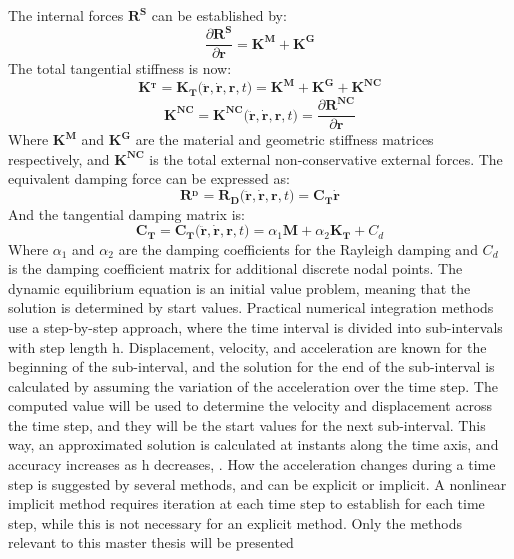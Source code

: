 \noindent The internal forces $\boldsymbol{R^S}$ can be established by:
\begin{equation}
    \frac{\partial \boldsymbol{R^S} }{\partial\boldsymbol{r}}= \boldsymbol{K^M}+\boldsymbol{K^G}
\end{equation}
\noindent The total tangential stiffness is now:
\begin{equation}
    \boldsymbol{K^_T}=\boldsymbol{K_T(\ddot{r},\dot{r},r},t)=\boldsymbol{K^M}+\boldsymbol{K^G}+\boldsymbol{K^{NC}}
\end{equation}
\begin{equation}
    \boldsymbol{K^{NC}}=\boldsymbol{K^{NC}(\ddot{r},\dot{r},r},t)=  \frac{\partial \boldsymbol{R^{NC}} }{\partial\boldsymbol{r}}
\end{equation}
\noindent Where $\boldsymbol{K^M}$ and $\boldsymbol{K^G}$ are the material and geometric stiffness matrices respectively, and $\boldsymbol{K^{NC}}$ is the total external non-conservative external forces. \newline
\newline
The equivalent damping force can be expressed as:
\begin{equation}
    \boldsymbol{R^_D}=\boldsymbol{R_D(\ddot{r},\dot{r},r},t)=  \boldsymbol{C_T}\boldsymbol{\dot{r}}
\end{equation}
And the tangential damping matrix is:
\begin{equation}
      \boldsymbol{C_{T}}=\boldsymbol{C_T(\ddot{r},\dot{r},r,}t)=\alpha_1 \boldsymbol{M}+\alpha_2\boldsymbol{K_T} + C_d 
\end{equation}
Where $\alpha_1$ and $\alpha_2$ are the damping coefficients for the Rayleigh damping and $C_d$ is the damping coefficient matrix for additional discrete nodal points.  
\noindent
\newline
\newline 
\noindent  The dynamic equilibrium equation is an initial value problem, meaning that the solution is determined by start values. Practical numerical integration methods use a step-by-step approach, where the time interval is divided into sub-intervals with step length h. Displacement, velocity, and acceleration are known for the beginning of the sub-interval, and the solution for the end of the sub-interval is calculated by assuming the variation of the acceleration over the time step. The computed value will be used to determine the velocity and displacement across the time step, and they will be the start values for the next sub-interval. This way, an approximated solution is calculated at instants along the time axis, and accuracy increases as h decreases, \cite{Langen1999}.
\newline 
\newline
 \noindent How the acceleration changes during a time step is suggested by several methods, and can be explicit or implicit. A nonlinear implicit method requires iteration at each time step to establish for each time step, while this is not necessary for an explicit method. Only the methods relevant to this master thesis will be presented\newline
 \newline
\noindent 
